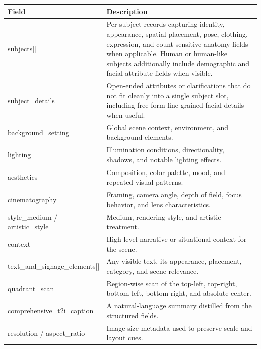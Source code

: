 \begin{tcolorbox}[
    colback=black!2,
    colframe=nvidiagreen!75!white,
    boxrule=0.4pt,
    arc=1pt,
    left=4pt,
    right=4pt,
    top=4pt,
    bottom=4pt,
    title=Top-level Fields in the Image Caption Schema
]
\small
\renewcommand{\arraystretch}{1.1}
\begin{tabularx}{\linewidth}{@{}>{\ttfamily}lX@{}}
\toprule
Field & Description \\
\midrule
subjects[] & Per-subject records capturing identity, appearance, spatial placement, pose, clothing, expression, and count-sensitive anatomy fields when applicable. Human or human-like subjects additionally include demographic and facial-attribute fields when visible. \\
subject\_details & Open-ended attributes or clarifications that do not fit cleanly into a single subject slot, including free-form fine-grained facial details when useful. \\
background\_setting & Global scene context, environment, and background elements. \\
lighting & Illumination conditions, directionality, shadows, and notable lighting effects. \\
aesthetics & Composition, color palette, mood, and repeated visual patterns. \\
cinematography & Framing, camera angle, depth of field, focus behavior, and lens characteristics. \\
style\_medium / artistic\_style & Medium, rendering style, and artistic treatment. \\
context & High-level narrative or situational context for the scene. \\
text\_and\_signage\_elements[] & Any visible text, its appearance, placement, category, and scene relevance. \\
quadrant\_scan & Region-wise scan of the top-left, top-right, bottom-left, bottom-right, and absolute center. \\
comprehensive\_t2i\_caption & A natural-language summary distilled from the structured fields. \\
resolution / aspect\_ratio & Image size metadata used to preserve scale and layout cues. \\
\bottomrule
\end{tabularx}
\end{tcolorbox}
